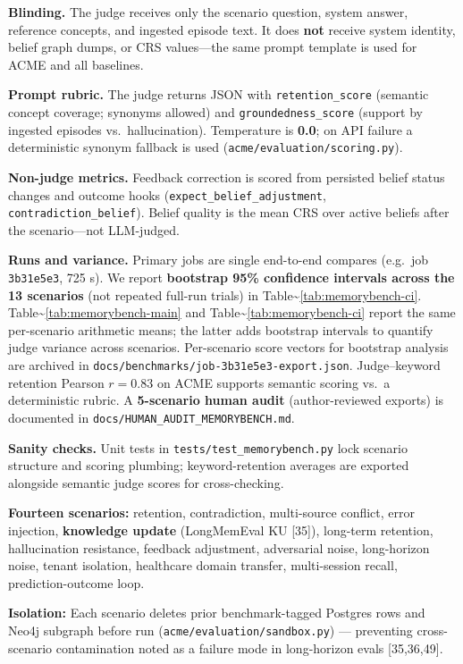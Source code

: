\documentclass[11pt,a4paper]{article}
\begin{document}
\textbf{Blinding.} The judge receives only the scenario question, system
answer, reference concepts, and ingested episode text. It does
\textbf{not} receive system identity, belief graph dumps, or CRS
values---the same prompt template is used for ACME and all baselines.

\textbf{Prompt rubric.} The judge returns JSON with
\texttt{retention\_score} (semantic concept coverage; synonyms allowed)
and \texttt{groundedness\_score} (support by ingested episodes
vs.~hallucination). Temperature is \textbf{0.0}; on API failure a
deterministic synonym fallback is used
(\texttt{acme/evaluation/scoring.py}).

\textbf{Non-judge metrics.} Feedback correction is scored from persisted
belief status changes and outcome hooks
(\texttt{expect\_belief\_adjustment}, \texttt{contradiction\_belief}).
Belief quality is the mean CRS over active beliefs after the
scenario---not LLM-judged.

\textbf{Runs and variance.} Primary jobs are single end-to-end compares
(e.g.~job \texttt{3b31e5e3}, 725 s). We report \textbf{bootstrap 95\%
confidence intervals across the 13 scenarios} (not repeated full-run
trials) in Table\textasciitilde{}\ref{tab:memorybench-ci}.
Table\textasciitilde{}\ref{tab:memorybench-main} and
Table\textasciitilde{}\ref{tab:memorybench-ci} report the same
per-scenario arithmetic means; the latter adds bootstrap intervals to
quantify judge variance across scenarios. Per-scenario score vectors for
bootstrap analysis are archived in
\texttt{docs/benchmarks/job-3b31e5e3-export.json}. Judge--keyword
retention Pearson \(r{=}0.83\) on ACME supports semantic scoring vs.~a
deterministic rubric. A \textbf{5-scenario human audit} (author-reviewed
exports) is documented in \texttt{docs/HUMAN\_AUDIT\_MEMORYBENCH.md}.

\textbf{Sanity checks.} Unit tests in
\texttt{tests/test\_memorybench.py} lock scenario structure and scoring
plumbing; keyword-retention averages are exported alongside semantic
judge scores for cross-checking.

\textbf{Fourteen scenarios:} retention, contradiction, multi-source
conflict, error injection, \textbf{knowledge update} (LongMemEval KU
{[}35{]}), long-term retention, hallucination resistance, feedback
adjustment, adversarial noise, long-horizon noise, tenant isolation,
healthcare domain transfer, multi-session recall, prediction-outcome
loop.

\textbf{Isolation:} Each scenario deletes prior benchmark-tagged
Postgres rows and Neo4j subgraph before run
(\texttt{acme/evaluation/sandbox.py}) --- preventing cross-scenario
contamination noted as a failure mode in long-horizon evals
{[}35,36,49{]}.
\end{document}
